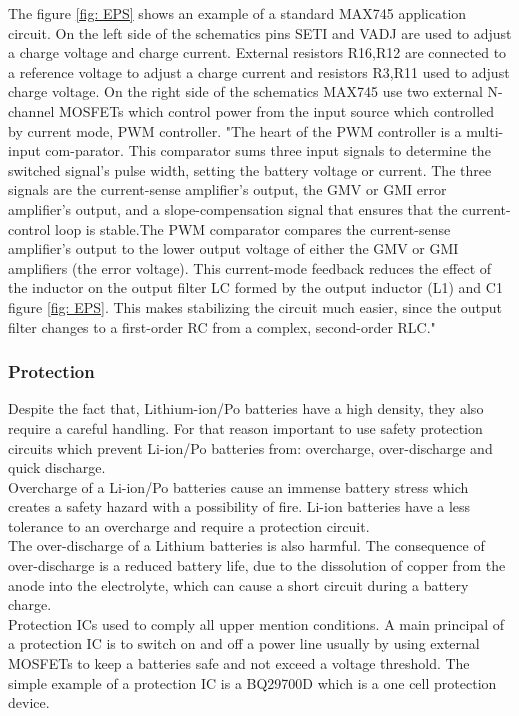 The figure \ref{fig: EPS} shows an example of a standard MAX745 application circuit. On the left side of the schematics pins SETI and VADJ are used to adjust a charge voltage and charge current. External resistors R16,R12 are connected to a reference voltage to adjust a charge current and resistors R3,R11  used to adjust charge voltage. On the right side of the schematics MAX745 use two external N-channel MOSFETs which control power from the input source which controlled by current mode, PWM controller. \cite{15}"The  heart  of  the  PWM  controller  is  a  multi-input  com-parator.  This  comparator  sums  three  input  signals  to  determine  the  switched  signal’s  pulse  width,  setting  the  battery  voltage  or  current.  The  three  signals  are  the  current-sense  amplifier’s  output,  the  GMV  or  GMI  error  amplifier’s  output,  and  a  slope-compensation  signal  that  ensures that the current-control loop is stable.The   PWM   comparator   compares   the   current-sense   amplifier’s output to the lower output voltage of either the GMV  or  GMI  amplifiers  (the  error  voltage).  This  current-mode feedback reduces the effect of the inductor on the output filter LC formed by the output inductor (L1) and C1 figure \ref{fig: EPS}. This makes stabilizing the circuit much easier, since the output filter changes to a first-order RC from a complex, second-order RLC."

\subsubsection{Protection}

Despite the fact that, Lithium-ion/Po batteries have a high density, they also require a careful handling. For that reason important to use safety protection circuits which prevent Li-ion/Po batteries from: overcharge, over-discharge and quick discharge.\\
\cite{16} Overcharge of a Li-ion/Po batteries cause an immense battery stress which creates a safety hazard with a possibility of fire. Li-ion batteries have a less tolerance to an overcharge and require a protection circuit.\\
The over-discharge of a Lithium batteries is also harmful. The consequence of over-discharge is a reduced battery life, due to the dissolution of copper from the anode into the electrolyte, which can cause a short circuit during a battery charge.\\
Protection ICs used to comply all upper mention conditions. A main principal of a protection IC is to switch on and off a power line usually by using external MOSFETs to keep a batteries safe and not exceed a voltage threshold. The simple example of a protection IC is a BQ29700D which is a one cell protection device. 

